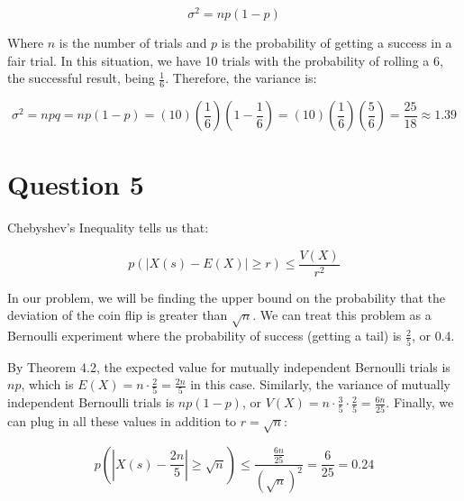 \documentclass[letterpaper, 12pt]{article}
\begin{document}
\[\sigma^2 = np(1-p)\]

Where $n$ is the number of trials and $p$ is the probability of getting a success in a fair trial. In this situation, we have 10 trials with the probability of rolling a 6, the successful result, being $\frac{1}{6}$. Therefore, the variance is:

\[\sigma^2 = npq = np(1-p) = (10)\left(\frac{1}{6}\right)\left(1- \frac{1}{6}\right) = (10)\left(\frac{1}{6}\right)\left(\frac{5}{6}\right) = \frac{25}{18} \approx 1.39\]

\section*{Question 5}
Chebyshev's Inequality tells us that:

\[p(\left|X(s) - E(X)\right| \geq r) \leq \frac{V(X)}{r^2}\]

In our problem, we will be finding the upper bound on the probability that the deviation of the coin flip is greater than $\sqrt{n}$. We can treat this problem as a Bernoulli experiment where the probability of success (getting a tail) is $\frac{2}{5}$, or 0.4. 

By Theorem 4.2, the expected value for mutually independent Bernoulli trials is $np$, which is $E(X) = n \cdot \frac{2}{5} = \frac{2n}{5}$ in this case. Similarly, the variance of mutually independent Bernoulli trials is $np(1-p)$, or $V(X) = n \cdot \frac{3}{5} \cdot \frac{2}{5} = \frac{6n}{25}$. Finally, we can plug in all these values in addition to $r = \sqrt{n}$:

\[p\left(\left|X(s) - \frac{2n}{5}\right| \geq \sqrt{n} \right) \leq \frac{\frac{6n}{25}}{{(\sqrt{n})}^2} = \frac{6}{25} = 0.24\]
\end{document}
